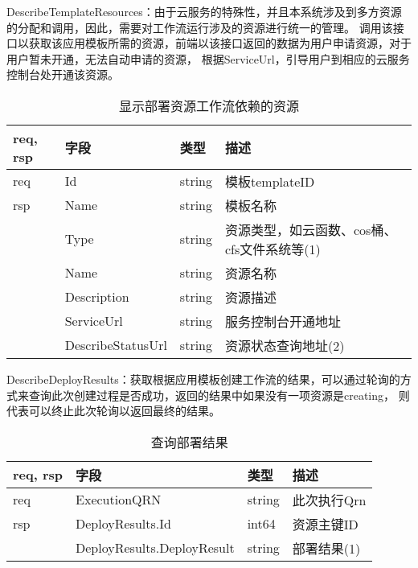 DescribeTemplateResources：由于云服务的特殊性，并且本系统涉及到多方资源的分配和调用，因此，需要对工作流运行涉及的资源进行统一的管理。
调用该接口以获取该应用模板所需的资源，前端以该接口返回的数据为用户申请资源，对于用户暂未开通，无法自动申请的资源，
根据ServiceUrl，引导用户到相应的云服务控制台处开通该资源。
\begin{table}[H]
    \centering
    \caption{显示部署资源工作流依赖的资源}
    \label{tab:design-interface-resources}
    \begin{tabular}{llll}
        \toprule
        req, rsp   & 字段 & 类型 & 描述 \\
        \midrule
        req & Id & string & 模板templateID\\ \hline
        rsp & Name & string & 模板名称\\
        & Type & string & 资源类型，如云函数、cos桶、cfs文件系统等(1)\\
        & Name & string & 资源名称\\
        & Description & string & 资源描述\\
        & ServiceUrl & string & 服务控制台开通地址\\
        & DescribeStatusUrl & string & 资源状态查询地址(2)\\
        \bottomrule
    \end{tabular}
\end{table}

DescribeDeployResults：获取根据应用模板创建工作流的结果，可以通过轮询的方式来查询此次创建过程是否成功，返回的结果中如果没有一项资源是creating，
则代表可以终止此次轮询以返回最终的结果。
\begin{table}[H]
    \centering
    \caption{查询部署结果}
    \label{tab:design-interface-deploy-results}
    \begin{tabular}{llll}
        \toprule
        req, rsp   & 字段 & 类型 & 描述 \\
        \midrule
        req & ExecutionQRN & string & 此次执行Qrn\\ \hline
        rsp & DeployResults.Id & int64 & 资源主键ID\\
        & DeployResults.DeployResult & string & 部署结果(1)\\
        \bottomrule
    \end{tabular}
\end{table}


